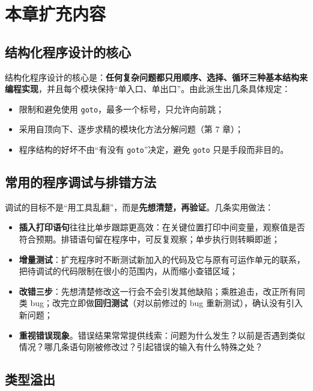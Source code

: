 \section{本章扩充内容}

\subsection{结构化程序设计的核心}

结构化程序设计的核心是：\textbf{任何复杂问题都只用顺序、选择、循环三种基本结构来编程实现}，并且每个模块保持“单入口、单出口”。由此派生出几条具体规定：

\begin{itemize}
  \item 限制和避免使用 \texttt{goto}，最多一个标号，只允许向前跳；
  \item 采用自顶向下、逐步求精的模块化方法分解问题（第 7 章）；
  \item 程序结构的好坏不由“有没有 \texttt{goto}”决定，避免 \texttt{goto} 只是手段而非目的。
\end{itemize}

\subsection{常用的程序调试与排错方法}

调试的目标不是“用工具乱翻”，而是\textbf{先想清楚，再验证}。几条实用做法：

\begin{itemize}
  \item \textbf{插入打印语句}往往比单步跟踪更高效：在关键位置打印中间变量，观察值是否符合预期。排错语句留在程序中，可反复观察；单步执行则转瞬即逝；
  \item \textbf{增量测试}：扩充程序时不断测试新加入的代码及它与原有可运作单元的联系，把待调试的代码限制在很小的范围内，从而缩小查错区域；
  \item \textbf{改错三步}：先想清楚修改这一行会不会引发其他缺陷；乘胜追击，改正所有同类 bug；改完立即做\textbf{回归测试}（对以前修过的 bug 重新测试），确认没有引入新问题；
  \item \textbf{重视错误现象}。错误结果常常提供线索：问题为什么发生？以前是否遇到类似情况？哪几条语句刚被修改过？引起错误的输入有什么特殊之处？
\end{itemize}

\subsection{类型溢出}

